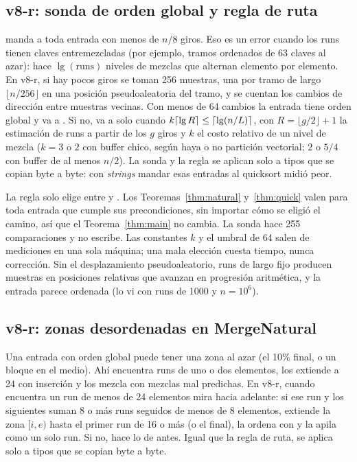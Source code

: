 \subsection{v8-r: sonda de orden global y regla de ruta}\label{sec:ruta}
\PocosGiros manda a \Natural toda entrada con menos de $n/8$ giros. Eso es un error
cuando los runs tienen claves entremezcladas (por ejemplo, tramos ordenados de 63 claves
al azar): \Natural hace $\lg(\text{runs})$ niveles de mezclas que alternan elemento por
elemento. En v8-r, si hay pocos giros se toman 256 muestras, una por tramo de largo
$\lfloor n/256\rfloor$ en una posición pseudoaleatoria del tramo, y se cuentan los
cambios de dirección entre muestras vecinas. Con menos de 64 cambios la entrada tiene
orden global y va a \Natural. Si no, va a \Natural solo cuando
$k\lceil\lg R\rceil\le\lceil\lg(n/L)\rceil$, con $R=\lfloor g/2\rfloor+1$ la
estimación de runs a partir de los $g$ giros y $k$ el costo relativo de un nivel de
mezcla ($k=3$ o $2$ con buffer chico, según haya o no partición vectorial; $2$ o $5/4$
con buffer de al menos $n/2$). La sonda y la regla se aplican solo a tipos que se copian
byte a byte: con \emph{strings} mandar esas entradas al quicksort midió peor.

\begin{observacion}\label{obs:ruta}
La regla solo elige entre \Natural y \Quick. Los Teoremas~\ref{thm:natural}
y~\ref{thm:quick} valen para toda entrada que cumple sus precondiciones, sin importar
cómo se eligió el camino, así que el Teorema~\ref{thm:main} no cambia. La sonda hace
255 comparaciones y no escribe. Las constantes $k$ y el umbral de 64 salen de mediciones
en una sola máquina; una mala elección cuesta tiempo, nunca corrección. Sin el
desplazamiento pseudoaleatorio, runs de largo fijo producen muestras en posiciones
relativas que avanzan en progresión aritmética, y la entrada parece ordenada
(lo vi con runs de 1000 y $n=10^6$).
\end{observacion}

\subsection{v8-r: zonas desordenadas en MergeNatural}\label{sec:zonas}
Una entrada con orden global puede tener una zona al azar (el 10\% final, o un bloque
en el medio). Ahí \Natural encuentra runs de uno o dos elementos, los extiende a 24 con
inserción y los mezcla con mezclas mal predichas. En v8-r, cuando \Natural encuentra un
run de menos de 24 elementos mira hacia adelante: si ese run y los siguientes suman 8
o más runs seguidos de menos de 8 elementos, extiende la zona $[i,e)$ hasta el primer
run de 16 o más (o el final), la ordena con \Quick y la apila como un solo run. Si no,
hace lo de antes. Igual que la regla de ruta, se aplica solo a tipos que se copian byte
a byte.

